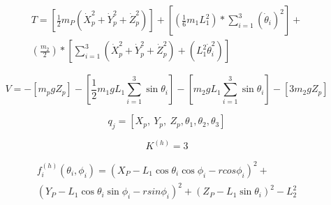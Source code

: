         \vspace{-0.8cm}
        \begin{multline}
         T= \left[ \frac{1}{2}m_{P} \left( \dot{X}_{p}^{2}+\dot{Y}_{p}^{2}+\dot{Z}_{p}^{2} \right)  \right] + \left[  \left( \frac{1}{6}m_{1}L_{1}^{2} \right) \ast \sum _{i=1}^{3} \left( \dot{ \theta }_{i} \right) ^{2} \right] + \\
          \left( \frac{m_{2}}{2} \right) \ast \left[  \sum _{i=1}^{3} \left( \dot{X}_{p}^{2}+\dot{Y}_{p}^{2}+\dot{Z}_{p}^{2} \right) + \left( L_{1}^{2}\dot{ \theta }_{i}^{2} \right)  \right]
        \label{eq:cap4_dina_ma_7}
        \end{multline}
        \vspace{-0.8cm}
 
        \begin{equation}
         V=- \left[ m_{p}gZ_{p} \right] - \left[ \frac{1}{2}m_{1}gL_{1} \sum _{i=1}^{3}\sin  \theta _{i} \right] - \left[ m_{2}gL_{1} \sum _{i=1}^{3}\sin  \theta _{i} \right] - \left[ 3m_{2}gZ_{p} \right]
        \label{eq:cap4_dina_ma_8}
        \end{equation}
        
        \begin{equation}
         q_{j}= \left[ X_{p},~Y_{p},~Z_{p}, \theta _{1}, \theta _{2}, \theta _{3} \right]
        \label{eq:cap4_dina_ma_9}
        \end{equation}
        
        \begin{equation}
         K^{ \left( h \right) }=3
        \label{eq:cap4_dina_ma_10}
        \end{equation}

        \vspace{-1cm}
        \begin{multline}
             f_{i}^{ \left( h \right) } \left(  \theta _{i}, \phi _{i} \right) = \left( X_{P}-L_{1}\cos  \theta _{i}\cos  \phi _{i}- rcos \phi _{i} \right) ^{2}+ \\ 
             \left( Y_{P}-L_{1}\cos  \theta _{i}\sin  \phi _{i}- rsin \phi _{i} \right) ^{2}+ \left( Z_{P}-L_{1}\sin  \theta _{i} \right) ^{2}-L_{2}^{2}
        \label{eq:cap4_dina_ma_11}
        \end{multline}
        
